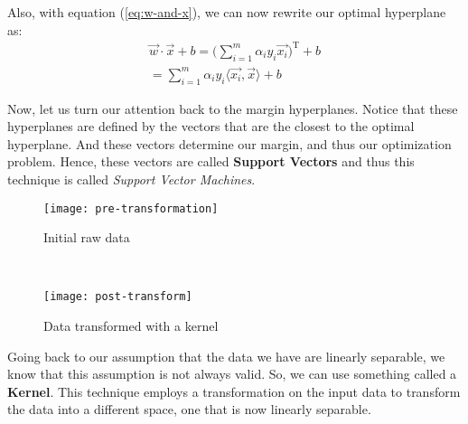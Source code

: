 Also, with equation (\ref{eq:w-and-x}), we can now rewrite our optimal hyperplane as:
\begin{align}
	\vec{w}\cdot\vec{x} + b = \Big(\sum_{i = 1}^{m}\alpha_{i}y_{i}\vec{x_i}\Big)^{\text{T}} + b \nonumber \\
= \sum_{i = 1}^{m}\alpha_{i}y_{i}\langle\vec{x_i}, \vec{x}\rangle + b \label{eq:new-plane}
\end{align}

Now, let us turn our attention back to the margin hyperplanes. Notice that these hyperplanes are defined by the vectors that are the closest to the optimal hyperplane. And these vectors determine our margin, and thus our optimization problem. Hence, these vectors are called \textbf{Support Vectors} and thus this technique is called \textit{Support Vector Machines}.

\begin{figure*}[!tb]
	\centering
	\begin{subfigure}[t]{0.5\textwidth}
		\texttt{[image: pre-transformation]}
		\caption{Initial raw data}
		\centering
		\label{fig:pre-trans}
	\end{subfigure}%
	~
	\begin{subfigure}[t]{0.5\textwidth}
		\texttt{[image: post-transform]}
		\caption{Data transformed with a kernel}
		\centering
		\label{fig:post-trans}
	\end{subfigure}%
	
	\caption{Initially, the data, (\ref{fig:pre-trans}), is not linearly separable i.e., cannot be separated by a hyperplane. After applying a kernel transform, our transformed data, (\ref{fig:post-trans}), becomes linearly separable. Now, we can use a Support Vector Machine to classify the data.}	
	\label{fig:kernel}
\end{figure*}

Going back to our assumption that the data we have are linearly separable, we know that this assumption is not always valid. So, we can use something called a \textbf{Kernel}. This technique employs a transformation on the input data to transform the data into a different space, one that is now linearly separable.


